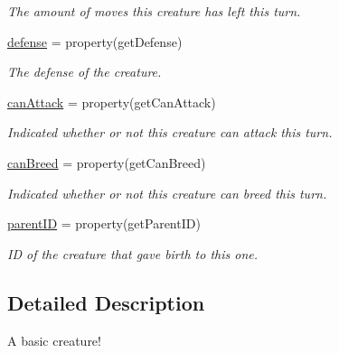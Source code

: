 \begin{DoxyCompactItemize}
\begin{DoxyCompactList}\small\item\em \-The amount of moves this creature has left this turn. \end{DoxyCompactList}\item 
\hypertarget{classGameObject_1_1Creature_a5262b111000a4744555dcd2eb75ddb7c}{\hyperlink{classGameObject_1_1Creature_a5262b111000a4744555dcd2eb75ddb7c}{defense} = property(get\-Defense)}\label{classGameObject_1_1Creature_a5262b111000a4744555dcd2eb75ddb7c}

\begin{DoxyCompactList}\small\item\em \-The defense of the creature. \end{DoxyCompactList}\item 
\hyperlink{classGameObject_1_1Creature_ae160991f9e14d17766d3b4e97199e35c}{can\-Attack} = property(get\-Can\-Attack)
\begin{DoxyCompactList}\small\item\em \-Indicated whether or not this creature can attack this turn. \end{DoxyCompactList}\item 
\hyperlink{classGameObject_1_1Creature_af4fe64a668080f7c27616f7f0a00e017}{can\-Breed} = property(get\-Can\-Breed)
\begin{DoxyCompactList}\small\item\em \-Indicated whether or not this creature can breed this turn. \end{DoxyCompactList}\item 
\hyperlink{classGameObject_1_1Creature_a284a7ea1861a216418941cb297ca4755}{parent\-I\-D} = property(get\-Parent\-I\-D)
\begin{DoxyCompactList}\small\item\em \-I\-D of the creature that gave birth to this one. \end{DoxyCompactList}\end{DoxyCompactItemize}


\subsection{\-Detailed \-Description}
\-A basic creature! 

